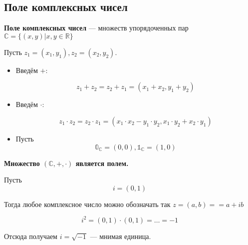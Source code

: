\subsection{Поле комплексных чисел}

{\bf Поле комплексных чисел} --- множеств упорядоченных пар $\mathbb{C} = \{(x, y) | x, y \in \mathbb{R}\}$


Пусть $z_1 = (x_1, y_1), z_2 = (x_2, y_2)$.

\begin{itemize}

\item Введём $+$: 

$$z_1 + z_2 = z_2 + z_1 = (x_1 + x_2, y_1 + y_2)$$

\item Введём $\cdot$:

$$z_1 \cdot z_2  = z_2 \cdot z_1  = (x_1 \cdot x_2 - y_1 \cdot y_2, x_1 \cdot y_2 + x_2 \cdot y_1)$$

\item Пусть $$\mathbb{0}_{\mathbb{C}} = (0, 0), \mathbb{1}_{\mathbb{C}} = (1, 0)$$

\end{itemize}

{\bf Множество $(\mathbb{C},+,\cdot)$ является полем.}

Пусть $$i = (0, 1)$$

Тогда любое комплексное число можно обозначать так $z = (a, b) == a + ib$

$$i ^ 2 = (0, 1) \cdot (0, 1) = \dots = -1$$

Отсюда получаем $i = \sqrt{-1}$ --- мнимая единица.



\pagebreak